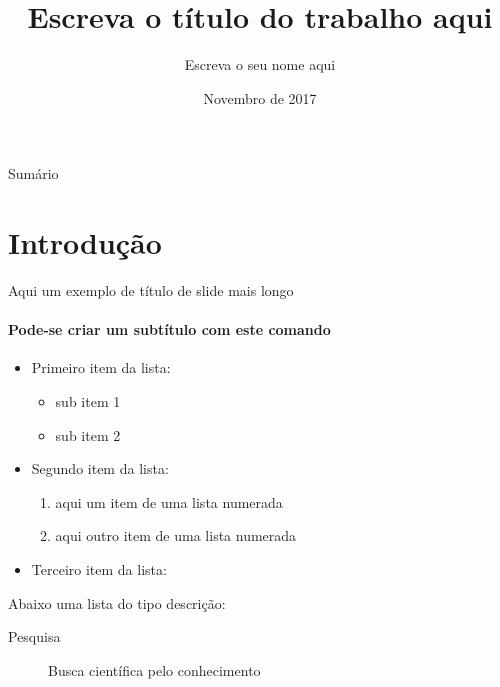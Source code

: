 \documentclass[aspectratio=169]{beamer}
\title{Escreva o título do trabalho aqui}
\subtitle{}
\author{Escreva o seu nome aqui}
\institute{\url{e-mail@dominio.edu}}
\date{Novembro de 2017}
\begin{document}
\begin{frame}[plain,t]
\titlepage
\end{frame}

\begin{frame}{Sumário}
\tableofcontents
\end{frame}


\section{Introdução}
\begin{frame}{Aqui um exemplo de título de slide mais longo}
\framesubtitle{Pode-se criar um subtítulo com este comando}
\begin{itemize}
\item Primeiro item da lista:
	\begin{itemize}
	\item sub item 1
	\item sub item 2
	\end{itemize}
\item Segundo item da lista:
	\begin{enumerate}
	\item aqui um item de uma lista numerada
	\item aqui outro item de uma lista numerada	\end{enumerate}
\item Terceiro item da lista:
\end{itemize}
Abaixo uma lista do tipo descrição:
\begin{description}
	\item[Pesquisa] Busca científica pelo conhecimento
\end{description}
\end{frame}
\end{document}
